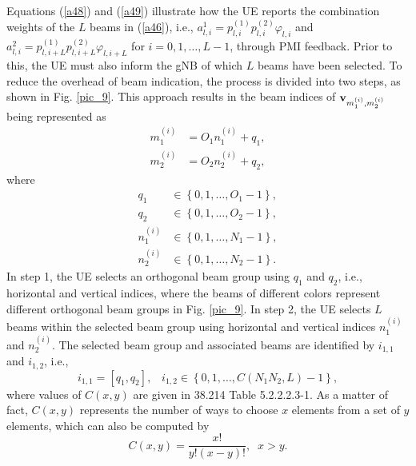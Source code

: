 \documentclass[lettersize,journal]{IEEEtran}
\begin{document}
Equations (\ref{a48}) and (\ref{a49}) illustrate how the UE reports the combination weights of the $L$ beams in (\ref{a46}), i.e., $a_{l,i}^1 = p_{l,i}^{(1)}p_{l,i}^{(2)}{\varphi _{l,i}}$ and $a_{l,i}^2 = p_{l,i + L}^{(1)}p_{l,i + L}^{(2)}{\varphi _{l,i + L}}$ for $i=0,1,\ldots,L-1$, through PMI feedback. Prior to this, the UE must also inform the gNB of which $L$ beams have been selected. To reduce the overhead of beam indication, the process is divided into two steps, as shown in Fig. \ref{pic_9}. This approach results in the beam indices of ${{\bf{v}}_{m_1^{(i)},m_2^{(i)}}}$ being represented as 
\begin{equation}\label{a32}
    \begin{aligned}
        m_{1}^{(i)}&=O_1n_{1}^{(i)}+q_1,\\
        m_{2}^{(i)}&=O_2n_{2}^{(i)}+q_2,
    \end{aligned}
\end{equation}
where 
\begin{equation} 
\begin{aligned}
{q_1} &\in \left\{ {0,1, \ldots ,{O_1} - 1} \right\},\\
{q_2} &\in \left\{ {0,1, \ldots ,{O_2} - 1} \right\},\\
n_1^{(i)} &\in \left\{ {0,1, \ldots ,{N_1} - 1} \right\},\\
n_2^{(i)} &\in \left\{ {0,1, \ldots ,{N_2} - 1} \right\}.
\end{aligned}
\end{equation}
In step 1, the UE selects an orthogonal beam group using $q_1$ and $q_2$, i.e., horizontal and vertical indices, where the beams of different colors represent different orthogonal beam groups in Fig. \ref{pic_9}. In step 2, the UE selects $L$ beams within the selected beam group using horizontal and vertical indices $n_1^{(i)}$ and $n_2^{(i)}$. The selected beam group and associated beams are identified by $i_{1,1}$ and $i_{1,2}$, i.e., 
\begin{equation}
  {i_{1,1}} = [{{q_1}},{{q_2}}], \;\;\;{i_{1,2}} \in \left\{ 0,1, \ldots , C(N_1N_2,L)-1 \right\},
\end{equation}
where values of $C(x,y)$ are given in 38.214 Table 5.2.2.2.3-1. As a matter of fact, $C(x,y)$ represents the number of ways to choose $x$ elements from a set of $y$ elements, which can also be computed by %
\begin{equation}\label{cxy}
 C(x,y) = \frac{{x!}}{{y!(x - y)!}},\;\;x > y.
\end{equation}
\end{document}
